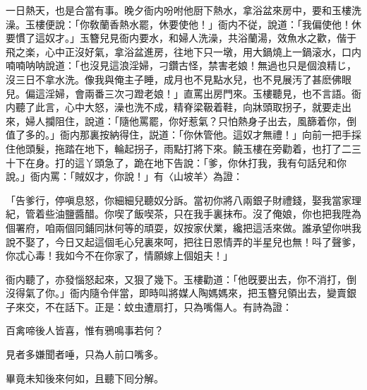 一日熱天，也是合當有事。晚夕衙内吩咐他厨下熱水，拿浴盆來房中，要和玉樓洗澡。玉樓便說：「你敎蘭香熱水罷，休要使他！」衙内不従，說道：「我偏使他！休要慣了這奴才。」玉簪兒見衙内要水，和婦人洗澡，共浴蘭湯，效魚水之歡，偕于飛之楽，心中正沒好氣，拿浴盆進房，往地下只一墩，用大鍋燒上一鍋滚水，口内喃喃呐呐說道：「也沒見這浪淫婦，刁鑽古怪，禁害老娘！無過也只是個浪精じ，沒三日不拿水洗。像我與俺主子睡，成月也不見點水兒，也不見展汚了甚麽佛眼兒。偏這淫婦，會兩番三次刁蹬老娘！」直罵出房門來。玉樓聽見，也不言語。衙内聽了此言，心中大怒，澡也洗不成，精脊梁靸着鞋，向牀頭取拐子，就要走出來，婦人攔阻住，說道：「隨他罵罷，你好惹氣？只怕熱身子出去，風篩着你，倒值了多的。」衙内那裏按納得住，説道：「你休管他。這奴才無禮！」向前一把手採住他頭髮，拖踏在地下，輪起拐子，雨點打將下來。饒玉樓在旁勸着，也打了二三十下在身。打的這丫頭急了，跪在地下告說：「爹，你休打我，我有句話兒和你說。」衙内罵：「賊奴才，你說！」有〈山坡羊〉為證：

\begin{myquote}
「告爹行，停嗔息怒，你細細兒聽奴分訴。當初你將八兩銀子財禮錢，娶我當家理紀，管着些油鹽醬醋。你喫了飯喫茶，只在我手裏抹布。沒了俺娘，你也把我陞為個署府，咱兩個同鋪同牀何等的頑耍，奴按家伏業，纔把這活來做。誰承望你哄我說不娶了，今日又起這個毛心兒裏來呵，把往日恩情弄的半星兒也無！呌了聲爹，你忒心毒！我如今不在你家了，情願嫁上個姐夫！」
\end{myquote}

衙内聽了，亦發惱怒起來，又狠了幾下。玉樓勸道：「他旣要出去，你不消打，倒沒得氣了你。」衙内隨令伴當，即時叫將媒人陶媽媽來，把玉簪兒領出去，變賣銀子來交，不在話下。正是：蚊虫遭扇打，只為嘴傷人。有詩為證：

\begin{myquote}
百禽啼後人皆喜，惟有鴉鳴事若何？

見者多嫌聞者唾，只為人前口嘴多。
\end{myquote}

畢竟未知後來何如，且聽下囘分解。

